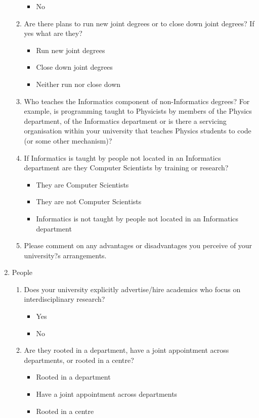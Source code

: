 \begin{enumerate}
\begin{enumerate}
\begin{itemize}
\item No
\end{itemize}
\item Are there plans to run new joint degrees or to close down joint
degrees? If yes what are they?
\begin{itemize}
\item Run new joint degrees
\item Close down joint degrees
\item Neither run nor close down
\end{itemize}
\item Who teaches the Informatics component of non-Informatics degrees? For example, is programming taught to Physicists by members
of the Physics department, of the Informatics department or is there a
servicing organisation within your university that teaches Physics
students to code (or some other mechanism)?
\item If Informatics is taught by people not located in an Informatics
 department are they Computer Scientists by training or research?
 \begin{itemize}
\item They are Computer Scientists
\item They are not Computer Scientists
\item Informatics is not taught by people not located in an Informatics department
\end{itemize}
\item Please comment on any advantages or disadvantages you perceive of your university?s arrangements.
\end{enumerate}
\item People
\begin{enumerate}
\item Does your university explicitly advertise/hire academics who focus
on interdisciplinary research?
\begin{itemize}
\item Yes
\item No
\end{itemize}
\item  Are they rooted in a department, have a joint appointment across
departments, or rooted in a centre?
\begin{itemize}
\item Rooted in a department
\item Have a joint appointment across departments
\item Rooted in a centre
\end{itemize}

\end{enumerate}
\end{enumerate}
